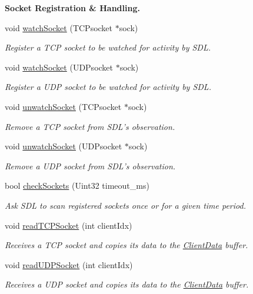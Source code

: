 \begin{Indent}{\bf Socket Registration \& Handling.}\par
\begin{DoxyCompactItemize}
\item 
void \hyperlink{classNetManager_a1d3f54e43abe28d9804d3348bc0eacd8}{watch\-Socket} (T\-C\-Psocket $\ast$sock)
\begin{DoxyCompactList}\small\item\em Register a T\-C\-P socket to be watched for activity by S\-D\-L. \end{DoxyCompactList}\item 
void \hyperlink{classNetManager_a3d0c6dcf246d88b510a2230227dd0e0a}{watch\-Socket} (U\-D\-Psocket $\ast$sock)
\begin{DoxyCompactList}\small\item\em Register a U\-D\-P socket to be watched for activity by S\-D\-L. \end{DoxyCompactList}\item 
void \hyperlink{classNetManager_a74e382ac7ea8b8ce09d11ea43a464385}{unwatch\-Socket} (T\-C\-Psocket $\ast$sock)
\begin{DoxyCompactList}\small\item\em Remove a T\-C\-P socket from S\-D\-L's observation. \end{DoxyCompactList}\item 
void \hyperlink{classNetManager_a46c2393e0deef57de2f3cda92d4ea9bd}{unwatch\-Socket} (U\-D\-Psocket $\ast$sock)
\begin{DoxyCompactList}\small\item\em Remove a U\-D\-P socket from S\-D\-L's observation. \end{DoxyCompactList}\item 
bool \hyperlink{classNetManager_a64ca334dbe3e4b540236aa35dccc96df}{check\-Sockets} (Uint32 timeout\-\_\-ms)
\begin{DoxyCompactList}\small\item\em Ask S\-D\-L to scan registered sockets once or for a given time period. \end{DoxyCompactList}\item 
void \hyperlink{classNetManager_a80c34b6f1d22a0db77a6f5063e6d31d9}{read\-T\-C\-P\-Socket} (int client\-Idx)
\begin{DoxyCompactList}\small\item\em Receives a T\-C\-P socket and copies its data to the \hyperlink{structClientData}{Client\-Data} buffer. \end{DoxyCompactList}\item 
void \hyperlink{classNetManager_a70c29117dc3c7fd49cee0444944a8eee}{read\-U\-D\-P\-Socket} (int client\-Idx)
\begin{DoxyCompactList}\small\item\em Receives a U\-D\-P socket and copies its data to the \hyperlink{structClientData}{Client\-Data} buffer. \end{DoxyCompactList}\end{DoxyCompactItemize}
\end{Indent}
